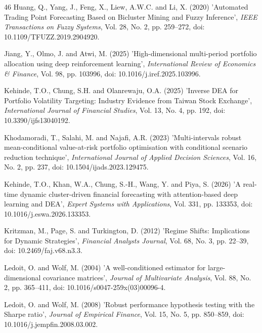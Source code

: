 \begin{thebibliography}{46}
Huang, Q., Yang, J., Feng, X., Liew, A.W.C. and Li, X. (2020) 'Automated Trading Point Forecasting Based on Bicluster Mining and Fuzzy Inference', {\it IEEE Transactions on Fuzzy Systems}, Vol. 28, No. 2, pp. 259--272, doi: 10.1109/TFUZZ.2019.2904920.

Jiang, Y., Olmo, J. and Atwi, M. (2025) 'High-dimensional multi-period portfolio allocation using deep reinforcement learning', {\it International Review of Economics \& Finance}, Vol. 98, pp. 103996, doi: 10.1016/j.iref.2025.103996.

Kehinde, T.O., Chung, S.H. and Olanrewaju, O.A. (2025) 'Inverse DEA for Portfolio Volatility Targeting: Industry Evidence from Taiwan Stock Exchange', {\it International Journal of Financial Studies}, Vol. 13, No. 4, pp. 192, doi: 10.3390/ijfs13040192.

Khodamoradi, T., Salahi, M. and Najafi, A.R. (2023) 'Multi-intervals robust mean-conditional value-at-risk portfolio optimisation with conditional scenario reduction technique', {\it International Journal of Applied Decision Sciences}, Vol. 16, No. 2, pp. 237, doi: 10.1504/ijads.2023.129475.

Kehinde, T.O., Khan, W.A., Chung, S.-H., Wang, Y. and Piya, S. (2026) 'A real-time dynamic cluster-driven financial forecasting with attention-based deep learning and DEA', {\it Expert Systems with Applications}, Vol. 331, pp. 133353, doi: 10.1016/j.eswa.2026.133353.

Kritzman, M., Page, S. and Turkington, D. (2012) 'Regime Shifts: Implications for Dynamic Strategies', {\it Financial Analysts Journal}, Vol. 68, No. 3, pp. 22--39, doi: 10.2469/faj.v68.n3.3.

Ledoit, O. and Wolf, M. (2004) 'A well-conditioned estimator for large-dimensional covariance matrices', {\it Journal of Multivariate Analysis}, Vol. 88, No. 2, pp. 365--411, doi: 10.1016/s0047-259x(03)00096-4.

Ledoit, O. and Wolf, M. (2008) 'Robust performance hypothesis testing with the Sharpe ratio', {\it Journal of Empirical Finance}, Vol. 15, No. 5, pp. 850--859, doi: 10.1016/j.jempfin.2008.03.002.


\end{thebibliography}
